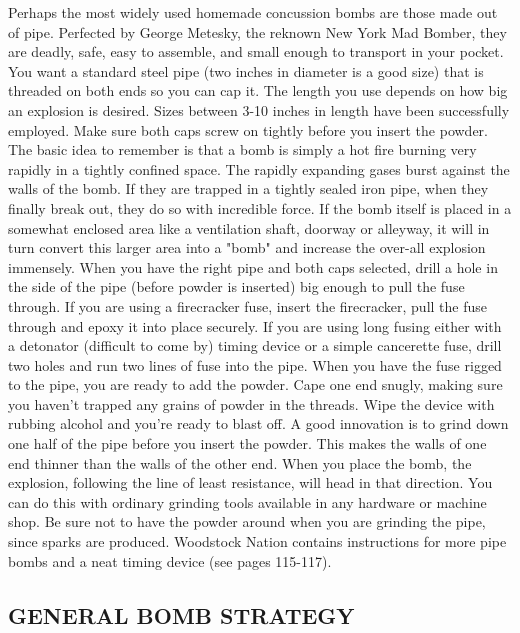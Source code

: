 \documentclass[11pt,twoside,a4paper]{book}
\begin{document}
	Perhaps the most widely used homemade concussion bombs are those made out of pipe. Perfected by George Metesky, the reknown New York Mad Bomber, they are deadly, safe, easy to assemble, and small enough to transport in your pocket. You want a standard steel pipe (two inches in diameter is a good size) that is threaded on both ends so you can cap it. The length you use depends on how big an explosion is desired. Sizes between 3-10 inches in length have been successfully employed. Make sure both caps screw on tightly before you insert the powder. The basic idea to remember is that a bomb is simply a hot fire burning very rapidly in a tightly confined space. The rapidly expanding gases burst against the walls of the bomb. If they are trapped in a tightly sealed iron pipe, when they finally break out, they do so with incredible force. If the bomb itself is placed in a somewhat enclosed area like a ventilation shaft, doorway or alleyway, it will in turn convert this larger area into a "bomb" and increase the over-all explosion immensely. When you have the right pipe and both caps selected, drill a hole in the side of the pipe (before powder is inserted) big enough to pull the fuse through. If you are using a firecracker fuse, insert the firecracker, pull the fuse through and epoxy it into place securely. If you are using long fusing either with a detonator (difficult to come by) timing device or a simple cancerette fuse, drill two holes and run two lines of fuse into the pipe. When you have the fuse rigged to the pipe, you are ready to add the powder. Cape one end snugly, making sure you haven't trapped any grains of powder in the threads. Wipe the device with rubbing alcohol and you're ready to blast off. A good innovation is to grind down one half of the pipe before you insert the powder. This makes the walls of one end thinner than the walls of the other end. When you place the bomb, the explosion, following the line of least resistance, will head in that direction. You can do this with ordinary grinding tools available in any hardware or machine shop. Be sure not to have the powder around when you are grinding the pipe, since sparks are produced. Woodstock Nation contains instructions for more pipe bombs and a neat timing device (see pages 115-117).

\subsection{GENERAL BOMB STRATEGY}
\end{document}
